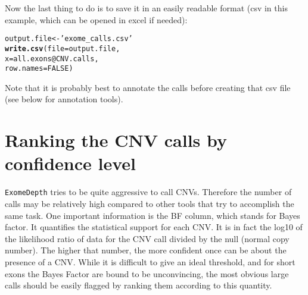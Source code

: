 \documentclass[10pt]{article}\usepackage[]{graphicx}\usepackage[]{color}
\makeatletter
\newcommand{\hlnum}[1]{\textcolor[rgb]{0.686,0.059,0.569}{#1}}%
\newcommand{\hlstr}[1]{\textcolor[rgb]{0.192,0.494,0.8}{#1}}%
\newcommand{\hlopt}[1]{\textcolor[rgb]{0,0,0}{#1}}%
\newcommand{\hlstd}[1]{\textcolor[rgb]{0.345,0.345,0.345}{#1}}%
\newcommand{\hlkwb}[1]{\textcolor[rgb]{0.69,0.353,0.396}{#1}}%
\newcommand{\hlkwc}[1]{\textcolor[rgb]{0.333,0.667,0.333}{#1}}%
\newcommand{\hlkwd}[1]{\textcolor[rgb]{0.737,0.353,0.396}{\textbf{#1}}}%
\newenvironment{kframe}{%
 \def\at@end@of@kframe{}%
 \ifinner\ifhmode%
  \def\at@end@of@kframe{\end{minipage}}%
  \begin{minipage}{\columnwidth}%
 \fi\fi%
 \def\FrameCommand##1{\hskip\@totalleftmargin \hskip-\fboxsep
 \colorbox{shadecolor}{##1}\hskip-\fboxsep
     \hskip-\linewidth \hskip-\@totalleftmargin \hskip\columnwidth}%
 \MakeFramed {\advance\hsize-\width
   \@totalleftmargin\z@ \linewidth\hsize
   \@setminipage}}%
 {\par\unskip\endMakeFramed%
 \at@end@of@kframe}
\newenvironment{knitrout}{}{} %
\makeatother
\begin{document}
Now the last thing to do is to save it in an easily readable format (csv in this example, which can be opened in excel if needed):
\begin{knitrout}
\color{fgcolor}\begin{kframe}
\begin{alltt}
\hlstd{output.file} \hlkwb{<-} \hlstr{'exome_calls.csv'}
\hlkwd{write.csv}\hlstd{(}\hlkwc{file} \hlstd{= output.file,}
          \hlkwc{x} \hlstd{= all.exons}\hlopt{@}\hlkwc{CNV.calls}\hlstd{,}
          \hlkwc{row.names} \hlstd{=} \hlnum{FALSE}\hlstd{)}
\end{alltt}
\end{kframe}
\end{knitrout}

Note that it is probably best to annotate the calls before creating that csv file (see below for annotation tools).


\section{Ranking the CNV calls by confidence level}

\texttt{ExomeDepth} tries to be quite aggressive to call CNVs. 
Therefore the number of calls may be relatively high compared to other tools that try to accomplish the same task.
One important information is the BF column, which stands for Bayes factor. 
It quantifies the statistical support for each CNV. 
It is in fact the log10 of the likelihood ratio of data for the CNV call divided by the null (normal copy number).
The higher that number, the more confident once can be about the presence of a CNV.
While it is difficult to give an ideal threshold, and for short exons the Bayes Factor are bound to be unconvincing, the most obvious large calls should be easily flagged by ranking them according to this quantity.
\end{document}
